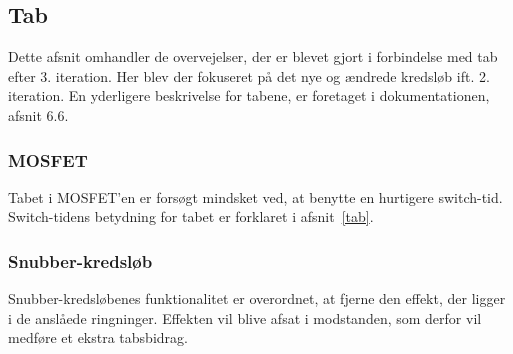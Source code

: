 
\subsection{Tab}
Dette afsnit omhandler de overvejelser, der er blevet gjort i forbindelse med tab efter 3. iteration. Her blev der fokuseret på det nye og ændrede kredsløb ift. 2. iteration. En yderligere beskrivelse for tabene, er foretaget i dokumentationen, afsnit 6.6.

\subsubsection{MOSFET}
\noindent Tabet i MOSFET'en er forsøgt mindsket ved, at benytte en hurtigere switch-tid. Switch-tidens betydning for tabet er forklaret i afsnit~\ref{tab}.


\subsubsection{Snubber-kredsløb}
\noindent Snubber-kredsløbenes funktionalitet er overordnet, at fjerne den effekt, der ligger i de anslåede ringninger. Effekten vil blive afsat i modstanden, som derfor vil medføre et ekstra tabsbidrag.